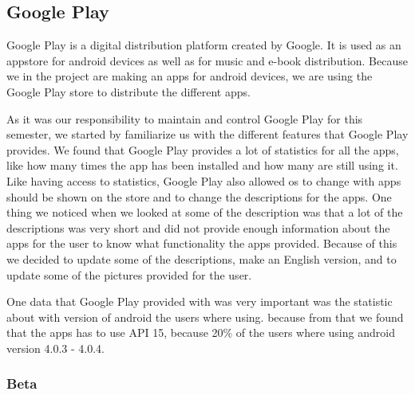 \subsection{Google Play}
Google Play is a digital distribution platform created by Google. It is used as an appstore for android devices as well as for music and e-book distribution. Because we in the project are making an apps for android devices, we are using the Google Play store to distribute the different apps. 

As it was our responsibility to maintain and control Google Play for this semester, we started by familiarize us with the different features that Google Play provides. We found that Google Play provides a lot of statistics for all the apps, like how many times the app has been installed and how many are still using it. Like having access to statistics, Google Play also allowed os to change with apps should be shown on the store and to change the descriptions for the apps. One thing we noticed when we looked at some of the description was that a lot of the descriptions was very short and did not provide enough information about the apps for the user to know what functionality the apps provided. Because of this we decided to update some of the descriptions, make an English version, and to update some of the pictures provided for the user.

One data that Google Play provided with was very important was the statistic about with version of android the users where using. because from that we found that the apps has to use API 15, because 20\% of the users where using android version 4.0.3 - 4.0.4. 

\subsubsection{Beta}
